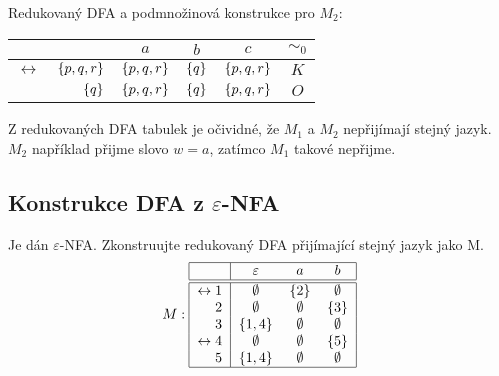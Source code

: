 Redukovaný DFA a podmnožinová konstrukce pro $M_2$:
\begin{multicols}{2}
    \begin{center}
        \begin{tabular}{|r r|c c c|c|}
            \hline
            & $ $ & $ a $ & $ b $ & $ c $ & $\sim_0$\\ \hline \hline
            $ \leftrightarrow $ & $\left\lbrace p, q, r \right\rbrace$& $\left\lbrace p, q, r \right\rbrace$ & $\left\lbrace q \right\rbrace$ & $\left\lbrace p, q, r \right\rbrace$ &$K$ \\
                                & $\left\lbrace q \right\rbrace$      & $\left\lbrace p, q, r \right\rbrace$ & $\left\lbrace q \right\rbrace$ & $\left\lbrace p, q, r \right\rbrace$ &$O$ \\
            \hline
        \end{tabular}
    \end{center}

\columnbreak

\end{multicols}

Z redukovaných DFA tabulek je očividné, že $M_1$ a $M_2$ nepřijímají stejný jazyk. $M_2$ například přijme slovo $w=a$,
zatímco $M_1$ takové nepřijme.

\subsection{Konstrukce DFA z \texorpdfstring{$\varepsilon$}{e}-NFA}
Je dán $\varepsilon$-NFA. Zkonstruujte redukovaný DFA přijímající stejný jazyk jako M.
\[
M:
\begin{tabular}{|r|c c c|}
    \hline
    & $\varepsilon$ & $a$ & $b$ \\ \hline \hline
    $\leftrightarrow 1$& $\emptyset$& $\bc{2}$   & $\emptyset$ \\
    $2$                & $\emptyset$& $\emptyset$& $\bc{3}$ \\
    $3$                & $\bc{1,4}$ & $\emptyset$& $\emptyset$ \\
    $\leftrightarrow 4$& $\emptyset$& $\emptyset$& $\bc{5}$ \\
    $5$                & $\bc{1,4}$ & $\emptyset$& $\emptyset$ \\
    \hline
\end{tabular}
\]

